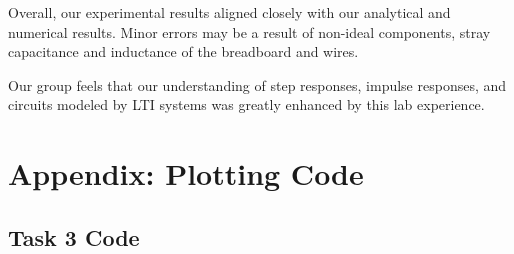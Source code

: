 \documentclass[12pt]{article}
\begin{document}
Overall, our experimental results aligned closely with our analytical and numerical results. Minor errors may be a result of non-ideal components, stray capacitance and inductance of the breadboard and wires.

Our group feels that our understanding of step responses, impulse responses, and circuits modeled by LTI systems was greatly enhanced by this lab experience.

\newpage
\section*{Appendix: Plotting Code}
\subsection*{Task 3 Code}
\end{document}
